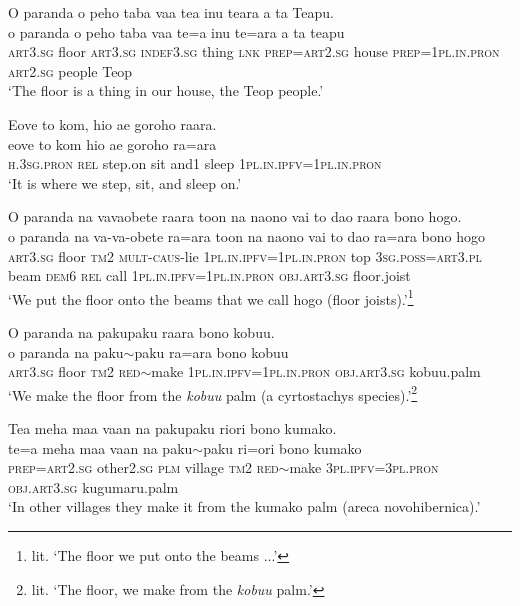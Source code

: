 \ea\label{ex:text15-1}
O paranda o peho taba vaa tea inu teara a ta Teapu.\\
\gll o	paranda	o	peho	taba	vaa	te=a	inu	te=ara	a	ta	teapu\\
     \textsc{art}3.\textsc{sg}	floor	\textsc{art}3.\textsc{sg}	\textsc{indef}3.\textsc{sg}	thing	\textsc{lnk}	\textsc{prep}=\textsc{art}2.\textsc{sg}	house	\textsc{prep}=1\textsc{pl}.\textsc{in}.\textsc{pron}	\textsc{art}2.\textsc{sg}	people	Teop\\
\glt `The floor is a thing in our house, the Teop people.'
\z

\ea\label{ex:text15-2}
Eove to kom, hio ae goroho raara.\\
\gll eove	to	kom	hio	ae	goroho	ra=ara\\
     \textsc{h}.3\textsc{sg}.\textsc{pron}	\textsc{rel}	step.on	sit	and1	sleep	1\textsc{pl}.\textsc{in}.\textsc{ipfv}=1\textsc{pl}.\textsc{in}.\textsc{pron}\\
\glt `It is where we step, sit, and sleep on.'
\z

\ea\label{ex:text15-3}
O paranda na vavaobete raara toon na naono vai to dao raara bono hogo.\\
\gll o	paranda	na	va-va-obete	ra=ara	toon	na	naono	vai	to	dao	ra=ara	bono	hogo\\
     \textsc{art}3.\textsc{sg}	floor	\textsc{tm}2	\textsc{mult}-\textsc{caus}-lie	1\textsc{pl}.\textsc{in}.\textsc{ipfv}=1\textsc{pl}.\textsc{in}.\textsc{pron}	top	3\textsc{sg}.\textsc{poss}=\textsc{art}3.\textsc{pl}	beam	\textsc{dem}6	\textsc{rel}	call	1\textsc{pl}.\textsc{in}.\textsc{ipfv}=1\textsc{pl}.\textsc{in}.\textsc{pron}	\textsc{obj}.\textsc{art}3.\textsc{sg}	floor.joist\\
\glt `We put the floor onto the beams that we call hogo (floor joists).'\footnote{lit. `The floor we put onto the beams ...'}
\z

\ea\label{ex:text15-4}
O paranda na pakupaku raara bono kobuu.\\
\gll o	paranda	na	paku{$\sim$}paku	ra=ara	bono	kobuu\\
     \textsc{art}3.\textsc{sg}	floor	\textsc{tm}2	\textsc{red}{$\sim$}make	1\textsc{pl}.\textsc{in}.\textsc{ipfv}=1\textsc{pl}.\textsc{in}.\textsc{pron}	\textsc{obj}.\textsc{art}3.\textsc{sg}	kobuu.palm\\
\glt `We make the floor from the \textit{kobuu} palm (a cyrtostachys species).'\footnote{lit. `The floor, we make from the \textit{kobuu} palm.'}
\z

\ea\label{ex:text15-5}
Tea meha maa vaan na pakupaku riori bono kumako.\\
\gll te=a	meha	maa	vaan	na	paku{$\sim$}paku	ri=ori	bono	kumako\\
     \textsc{prep}=\textsc{art}2.\textsc{sg}	other2.\textsc{sg}	\textsc{plm}	village	\textsc{tm}2	\textsc{red}{$\sim$}make	3\textsc{pl}.\textsc{ipfv}=3\textsc{pl}.\textsc{pron}	\textsc{obj}.\textsc{art}3.\textsc{sg}	kugumaru.palm\\
\glt `In other villages they make it from the kumako palm (areca novohibernica).'
\z

